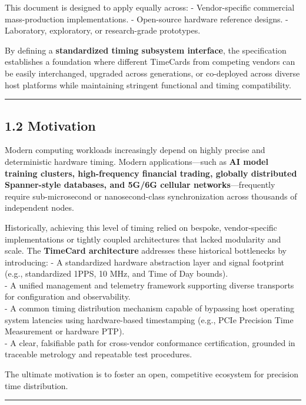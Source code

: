 This document is designed to apply equally across: - Vendor-specific
commercial mass-production implementations. - Open-source hardware
reference designs. - Laboratory, exploratory, or research-grade
prototypes.

By defining a \textbf{standardized timing subsystem interface}, the
specification establishes a foundation where different TimeCards from
competing vendors can be easily interchanged, upgraded across
generations, or co-deployed across diverse host platforms while
maintaining stringent functional and timing compatibility.

\begin{center}\rule{0.5\linewidth}{0.5pt}\end{center}

\subsection{1.2 Motivation}\label{motivation}

Modern computing workloads increasingly depend on highly precise and
deterministic hardware timing. Modern applications---such as \textbf{AI
model training clusters, high-frequency financial trading, globally
distributed Spanner-style databases, and 5G/6G cellular
networks}---frequently require sub-microsecond or nanosecond-class
synchronization across thousands of independent nodes.

Historically, achieving this level of timing relied on bespoke,
vendor-specific implementations or tightly coupled architectures that
lacked modularity and scale. The \textbf{TimeCard architecture}
addresses these historical bottlenecks by introducing: - A standardized
hardware abstraction layer and signal footprint (e.g., standardized
1PPS, 10 MHz, and Time of Day bounds).\\
- A unified management and telemetry framework supporting diverse
transports for configuration and observability.\\
- A common timing distribution mechanism capable of bypassing host
operating system latencies using hardware-based timestamping (e.g., PCIe
Precision Time Measurement or hardware PTP).\\
- A clear, falsifiable path for cross-vendor conformance certification,
grounded in traceable metrology and repeatable test procedures.

The ultimate motivation is to foster an open, competitive ecosystem for
precision time distribution.

\begin{center}\rule{0.5\linewidth}{0.5pt}\end{center}

